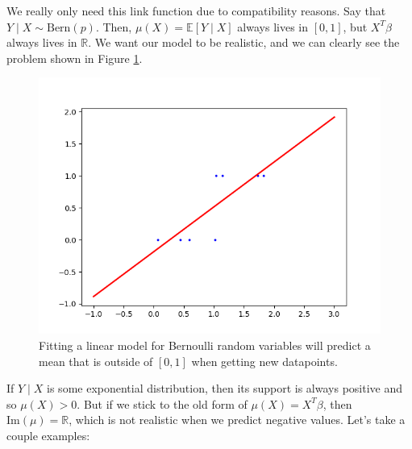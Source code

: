   We really only need this link function due to compatibility reasons. Say that $Y \mid X \sim \mathrm{Bern}(p)$. Then, $\mu(X) = \mathbb{E}[Y \mid X]$ always lives in $[0, 1]$, but $X^T \beta$ always lives in $\mathbb{R}$. We want our model to be realistic, and we can clearly see the problem shown in Figure \ref{fig:Bernoulli_GLM}. 

  \begin{figure}[H]
    \centering
    \includegraphics[scale=0.5]{img/GLM_bernoulli.png}
    \caption{Fitting a linear model for Bernoulli random variables will predict a mean that is outside of $[0, 1]$ when getting new datapoints. }
    \label{fig:Bernoulli_GLM}
  \end{figure}

  If $Y \mid X$ is some exponential distribution, then its support is always positive and so $\mu(X) > 0$. But if we stick to the old form of $\mu(X) = X^T \beta$, then $\mathrm{Im}(\mu) = \mathbb{R}$, which is not realistic when we predict negative values. Let's take a couple examples: 

